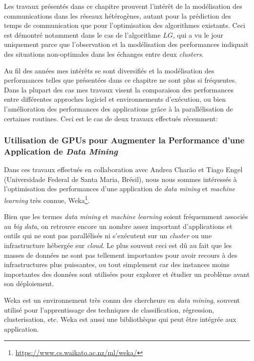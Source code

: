 Les travaux présentés dans ce chapitre prouvent l'intérêt de la modélisation des communications dans les réseaux hétérogènes, autant pour la prédiction des temps de communication que pour l'optimisation des algorithmes existants. Ceci est démontré notamment dans le cas de l'algorithme $LG$, qui a vu le jour uniquement parce que l'observation et la modélisation des performances indiquait des situations non-optimales dans les échanges entre deux \textit{clusters}.

Au fil des années mes intérêts se sont diversifiés et la modélisation des performances telles que présentées dans ce chapitre ne sont plus si fréquentes. Dans la plupart des cas mes travaux visent la comparaison des performances entre différentes approches logiciel et environnements d'exécution, ou bien l'amélioration des performances des applications grâce à la parallélisation de certaines routines. Ceci est le cas de deux travaux effectués récemment:

\subsubsection*{Utilisation de GPUs pour Augmenter la Performance d'une Application de \textit{Data Mining}}

Dans ces travaux effectués en collaboration avec Andrea Charão et Tiago Engel (Universidade Federal de Santa Maria, Brésil), nous nous sommes intéressés à l'optimisation des performances d'une application de \textit{data mining} et \textit{machine learning }très connue, Weka\footnote{\url{https://www.cs.waikato.ac.nz/ml/weka/}}. 

Bien que les termes \textit{data mining} et \textit{machine learning} soient fréquemment associés au \textit{big data}, on retrouve encore un nombre assez important d'applications et outils qui ne sont pas parallélisés ni s'exécutent sur un \textit{cluster} ou une infrastructure hébergée sur \textit{cloud}. Le plus souvent ceci est dû au fait que les masses de données ne sont pas tellement importantes pour avoir recours à des infrastructures plus puissantes, ou tout simplement car des instances moins importantes des données sont utilisées pour explorer et étudier un problème avant son déploiement.

Weka est un environnement très connu des chercheurs en \textit{data mining}, souvent utilisé pour l'apprentissage des techniques de classification, régression, clusterisation, etc. Weka est aussi une bibliothèque qui peut être intégrée aux application.  


